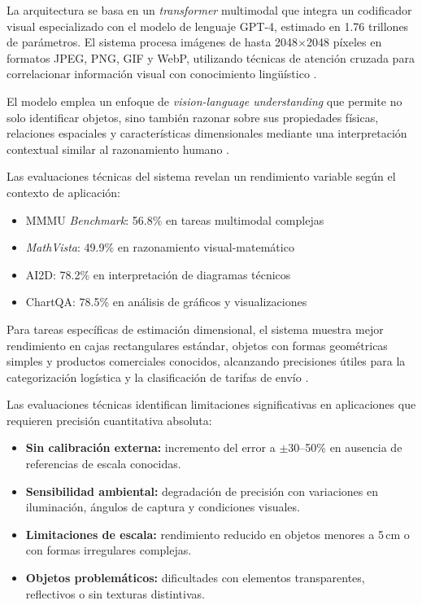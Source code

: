 La arquitectura se basa en un \textit{transformer} multimodal que integra un codificador visual especializado con el modelo de lenguaje GPT-4, estimado en 1.76 trillones de parámetros. El sistema procesa imágenes de hasta 2048$\times$2048 píxeles en formatos JPEG, PNG, GIF y WebP, utilizando técnicas de atención cruzada para correlacionar información visual con conocimiento lingüístico \cite{ArticleRef255134}.

El modelo emplea un enfoque de \textit{vision-language understanding} que permite no solo identificar objetos, sino también razonar sobre sus propiedades físicas, relaciones espaciales y características dimensionales mediante una interpretación contextual similar al razonamiento humano \cite{ArticleRef255136}.

Las evaluaciones técnicas del sistema revelan un rendimiento variable según el contexto de aplicación:

\begin{itemize}
    \item MMMU \textit{Benchmark}: 56.8\% en tareas multimodal complejas
    \item \textit{MathVista}: 49.9\% en razonamiento visual-matemático
    \item AI2D: 78.2\% en interpretación de diagramas técnicos
    \item ChartQA: 78.5\% en análisis de gráficos y visualizaciones
\end{itemize}

Para tareas específicas de estimación dimensional, el sistema muestra mejor rendimiento en cajas rectangulares estándar, objetos con formas geométricas simples y productos comerciales conocidos, alcanzando precisiones útiles para la categorización logística y la clasificación de tarifas de envío \cite{Yu2024}.

Las evaluaciones técnicas identifican limitaciones significativas en aplicaciones que requieren precisión cuantitativa absoluta:

\begin{itemize}
    \item \textbf{Sin calibración externa:} incremento del error a $\pm$30--50\% en ausencia de referencias de escala conocidas.
    \item \textbf{Sensibilidad ambiental:} degradación de precisión con variaciones en iluminación, ángulos de captura y condiciones visuales.
    \item \textbf{Limitaciones de escala:} rendimiento reducido en objetos menores a 5\,cm o con formas irregulares complejas.
    \item \textbf{Objetos problemáticos:} dificultades con elementos transparentes, reflectivos o sin texturas distintivas.
\end{itemize}

